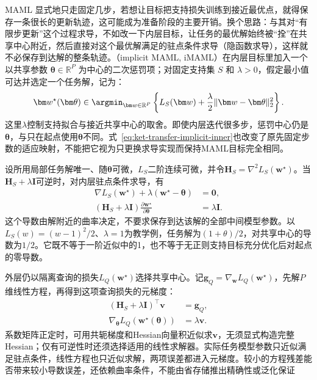 MAML 显式地只走固定几步，若想让目标把支持损失训练到接近最优点，就得保存一条很长的更新轨迹，这可能成为准备阶段的主要开销。换个思路：与其对“有限步更新”这个过程求导，不如改一下内层目标，让任务的最优解始终被“拴”在共享中心附近，然后直接对这个最优解满足的驻点条件求导（隐函数求导），这样就不必保存到达解的整条轨迹。（implicit MAML, iMAML）在内层目标里加入一个以共享参数 $\bm\theta\in\mathbb R^P$ 为中心的二次惩罚项；对固定支持集 $S$ 和 $\lambda>0$，假定最小值可达并选定一个任务解，记为：
\begin{equation}
  \bm w^\star(\bm\theta)
  \in\argmin_{\bm w\in\mathbb R^P}
    \left\{L_S(\bm w)
       +\frac{\lambda}{2}\|\bm w-\bm\theta\|_2^2\right\}.
  \label{eq:ket-transfer-implicit-inner}
\end{equation}
这里$\lambda$控制支持拟合与接近共享中心的取舍。即使内层迭代很多步，惩罚中心仍是$\bm\theta$，与只在起点使用$\bm\theta$不同。式~\eqref{eq:ket-transfer-implicit-inner}也改变了原先固定步数的适应映射，不能把它视为只更换求导实现而保持MAML目标完全相同。

设所用局部任务解唯一、随$\bm\theta$可微，$L_S$二阶连续可微，并令$\bm H_S=\nabla^2L_S(\bm w^\star)$。当$\bm H_S+\lambda\bm I$可逆时，对内层驻点条件求导，有
\begin{align}
  \nabla L_S(\bm w^\star)
       +\lambda(\bm w^\star-\bm\theta)&=\bm0,\nonumber\\
  (\bm H_S+\lambda\bm I)
       \frac{\partial\bm w^\star}{\partial\bm\theta}
       &=\lambda\bm I.
  \label{eq:ket-transfer-implicit-jacobian}
\end{align}
这个导数由解附近的曲率决定，不要求保存到达该解的全部中间模型参数。以$L_S(w)=(w-1)^2/2$、$\lambda=1$为教学例，任务解为$(1+\theta)/2$，对共享中心的导数为$1/2$。它既不等于一阶近似中的1，也不等于无正则支持目标充分优化后对起点的零导数。

外层仍以隔离查询的损失$L_Q(\bm w^\star)$选择共享中心。记$\bm g_Q=\nabla_{\bm w}L_Q(\bm w^\star)$，先解$P$维线性方程，再得到这项查询损失的元梯度：
\begin{equation}
  \begin{aligned}
    (\bm H_S+\lambda\bm I)^{\top}\bm v&=\bm g_Q,\\
    \nabla_{\bm\theta}L_Q(\bm w^\star(\bm\theta))
      &=\lambda\bm v.
  \end{aligned}
  \label{eq:ket-transfer-implicit-gradient}
\end{equation}
系数矩阵正定时，可用共轭梯度和Hessian向量积近似求$\bm v$，无须显式构造完整Hessian；仅有可逆性时还须选择适用的线性求解器。实际任务模型参数只近似满足驻点条件，线性方程也只近似求解，两项误差都进入元梯度。较小的方程残差能否带来较小导数误差，还依赖曲率条件，不能由省存储推出精确性或泛化保证

